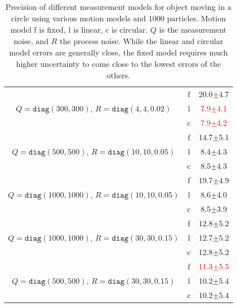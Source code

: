 \documentclass[a4paper,12pt]{article}
\begin{document}
\begin{enumerate}
\begin{table}
\begin{tabular}{ccc}
      \multirow{3}{*}{$Q=\texttt{diag}(300,300)$, $R=\texttt{diag}(4, 4, 0.02)$}& f    & 20.0$\pm$4.7 \\
      & l    & \textcolor{red}{7.9$\pm$4.1}     \\
      & c    & \textcolor{red}{7.9$\pm$4.2}     \\\hline

      \multirow{3}{*}{$Q=\texttt{diag}(500,500)$, $R=\texttt{diag}(10, 10, 0.05)$}& f    & 14.7$\pm$5.1 \\
      & l    & 8.4$\pm$4.3     \\
      & c    & 8.5$\pm$4.3     \\\hline

      \multirow{3}{*}{$Q=\texttt{diag}(1000,1000)$, $R=\texttt{diag}(10,10,0.05)$}               & f    & 19.7$\pm$4.9   \\
      & l    & 8.6$\pm$4.0    \\
      & c    & 8.5$\pm$3.9    \\\hline

      \multirow{3}{*}{$Q=\texttt{diag}(1000,1000)$, $R=\texttt{diag}(30,30,0.15)$}& f    & 12.8$\pm$5.2    \\
      & l    & 12.7$\pm$5.2    \\
      & c    & 12.8$\pm$5.2    \\\hline

      \multirow{3}{*}{$Q=\texttt{diag}(500,500)$, $R=\texttt{diag}(30,30,0.15)$}& f    & \textcolor{red}{11.3$\pm$5.5}   \\
      & l    & 10.2$\pm$5.4   \\
      & c    & 10.2$\pm$5.4    \\\hline

    \end{tabular}
    \caption{Precision of different measurement models for object moving in a
      circle using various motion models and 1000 particles. Motion model f is fixed, l is linear, c is circular. $Q$ is the
      measurement noise, and $R$ the process noise. While the linear and
      circular model errors are generally close, the fixed model requires much
      higher uncertainty to come close to the lowest errors of the others.}
    \label{tab:circ}
  \end{table}
\end{enumerate}
\newpage
\end{document}
